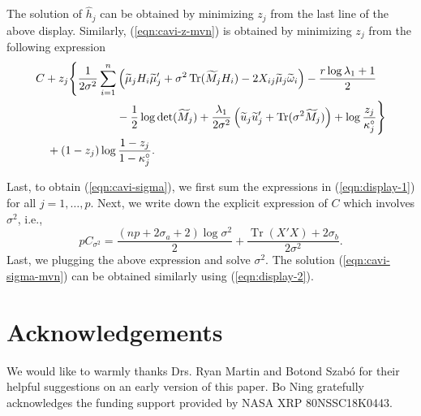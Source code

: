 \documentclass[pdftex, noinfoline, letter]{imsart}
\DeclareMathOperator{\Tr}{Tr}
\theoremstyle{plain}
\begin{document}
The solution of $\widehat  h_j$ can be obtained by minimizing $z_j$ from the last line of the above display.
Similarly, (\ref{eqn:cavi-z-mvn}) is obtained by minimizing $z_j$ from the following expression 
\begin{equation}
\begin{split}
 & C+z_j\Bigg\{
    \frac{1}{2\sigma^2} \sum_{i=1}^n 
    \left(
        \widetilde \mu_j H_i \widetilde \mu_j'
        +\sigma^2 \Tr(\widetilde M_j H_i)
        - 2X_{ij} \widetilde \mu_j \widetilde  \omega_i
    \right)
     - \frac{r\log \lambda_1 + 1}{2}
    \\
    & \hspace{2.5cm}
      - \frac{1}{2}\log \det(\widetilde M_j) + \frac{\lambda_1}{2\sigma^2}
       \left(
       	 \widetilde  u_j \widetilde  u_j' + \Tr(\sigma^2 \widetilde  M_j)
       \right)
    + \log \frac{z_j}{\kappa_j^\circ}
    \Bigg\}\\
    &\quad+ (1-z_j) \log \frac{1-z_j}{1-\kappa_j^\circ}.
    \label{eqn:display-2}
    \end{split}
\end{equation}


Last, to obtain (\ref{eqn:cavi-sigma}), we first
sum the expressions in (\ref{eqn:display-1}) for all $j =1, \dots, p$. Next, we write down the explicit expression of $C$ which involves $\sigma^2$, i.e.,
$$
pC_{\sigma^2} = \frac{(np + 2\sigma_a +2)\log \sigma^2}{2} + \frac{\Tr(X'X) + 2\sigma_b}{2\sigma^2}.
$$
Last, we plugging the above expression and solve $\sigma^2$. 
The solution (\ref{eqn:cavi-sigma-mvn}) can be obtained similarly using (\ref{eqn:display-2}).



\begin{supplement}
\end{supplement}


\section*{Acknowledgements}
We would like to warmly thanks Drs. Ryan Martin and Botond Szab\'o for their helpful suggestions on an early version of this paper. Bo Ning gratefully acknowledges the funding support provided by NASA XRP 80NSSC18K0443.




\end{document}

